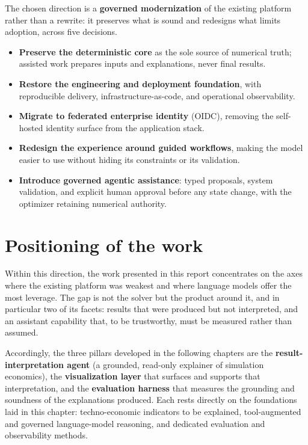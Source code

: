 The chosen direction is a \textbf{governed modernization} of the existing
platform rather than a rewrite: it preserves what is sound and redesigns what
limits adoption, across five decisions.

\begin{itemize}
  \item \textbf{Preserve the deterministic core} as the sole source of numerical
    truth; assisted work prepares inputs and explanations, never final results.
  \item \textbf{Restore the engineering and deployment foundation}, with
    reproducible delivery, infrastructure-as-code, and operational observability.
  \item \textbf{Migrate to federated enterprise identity} (OIDC), removing the
    self-hosted identity surface from the application stack.
  \item \textbf{Redesign the experience around guided workflows}, making the
    model easier to use without hiding its constraints or its validation.
  \item \textbf{Introduce governed agentic assistance}: typed proposals, system
    validation, and explicit human approval before any state change, with the
    optimizer retaining numerical authority.
\end{itemize}

\section{Positioning of the work}
\label{sec:positioning}

Within this direction, the work presented in this report concentrates on
the axes where the existing platform was weakest and where language models offer
the most leverage. The gap is not the solver but the product around it, and in
particular two of its facets: results that were produced but not interpreted, and
an assistant capability that, to be trustworthy, must be measured rather than
assumed.

Accordingly, the three pillars developed in the following chapters are the
\textbf{result-interpretation agent} (a grounded, read-only explainer of
simulation economics), the \textbf{visualization layer} that surfaces and
supports that interpretation, and the \textbf{evaluation harness} that measures
the grounding and soundness of the explanations produced. Each rests directly on
the foundations laid in this chapter: techno-economic indicators to be explained,
tool-augmented and governed language-model reasoning, and dedicated evaluation and
observability methods.


